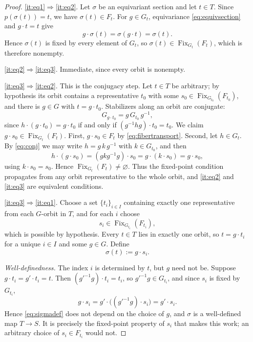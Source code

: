 \documentclass[11pt,reqno]{amsart}
\theoremstyle{plain}
\theoremstyle{definition}
\theoremstyle{remark}
\DeclareMathOperator{\Fix}{Fix}
\begin{document}
\begin{proof}
\ref{it:eq1}$\Rightarrow$\ref{it:eq2}. Let $\sigma$ be an equivariant section and let $t\in T$. Since $p(\sigma(t))=t$, we have $\sigma(t)\in F_{t}$. For $g\in G_{t}$, equivariance \eqref{eq:equivsection} and $g\cdot t=t$ give
\[
g\cdot\sigma(t)=\sigma(g\cdot t)=\sigma(t).
\]
Hence $\sigma(t)$ is fixed by every element of $G_{t}$, so $\sigma(t)\in\Fix_{G_{t}}(F_{t})$, which is therefore nonempty.

\ref{it:eq2}$\Rightarrow$\ref{it:eq3}. Immediate, since every orbit is nonempty.

\ref{it:eq3}$\Rightarrow$\ref{it:eq2}. This is the conjugacy step. Let $t\in T$ be arbitrary; by hypothesis its orbit contains a representative $t_{0}$ with some $s_{0}\in\Fix_{G_{t_{0}}}(F_{t_{0}})$, and there is $g\in G$ with $t=g\cdot t_{0}$. Stabilizers along an orbit are conjugate:
\begin{equation}
\label{eq:conj}
G_{g\cdot t_{0}}=g\,G_{t_{0}}\,g^{-1},
\end{equation}
since $h\cdot(g\cdot t_{0})=g\cdot t_{0}$ if and only if $(g^{-1}hg)\cdot t_{0}=t_{0}$. We claim $g\cdot s_{0}\in\Fix_{G_{t}}(F_{t})$. First, $g\cdot s_{0}\in F_{t}$ by \eqref{eq:fibertransport}. Second, let $h\in G_{t}$. By \eqref{eq:conj} we may write $h=g\,k\,g^{-1}$ with $k\in G_{t_{0}}$, and then
\[
h\cdot(g\cdot s_{0})
=(g k g^{-1} g)\cdot s_{0}
=g\cdot(k\cdot s_{0})
=g\cdot s_{0},
\]
using $k\cdot s_{0}=s_{0}$. Hence $\Fix_{G_{t}}(F_{t})\neq\varnothing$. Thus the fixed-point condition propagates from any orbit representative to the whole orbit, and \ref{it:eq2} and \ref{it:eq3} are equivalent conditions.

\ref{it:eq3}$\Rightarrow$\ref{it:eq1}. Choose a set $\{t_{i}\}_{i\in I}$ containing exactly one representative from each $G$-orbit in $T$, and for each $i$ choose
\[
s_{i}\in\Fix_{G_{t_{i}}}(F_{t_{i}}),
\]
which is possible by hypothesis. Every $t\in T$ lies in exactly one orbit, so $t=g\cdot t_{i}$ for a unique $i\in I$ and some $g\in G$. Define
\begin{equation}
\label{eq:sigmadef}
\sigma(t):=g\cdot s_{i}.
\end{equation}

\emph{Well-definedness.} The index $i$ is determined by $t$, but $g$ need not be. Suppose $g\cdot t_{i}=g'\cdot t_{i}=t$. Then $(g'^{-1}g)\cdot t_{i}=t_{i}$, so $g'^{-1}g\in G_{t_{i}}$, and since $s_{i}$ is fixed by $G_{t_{i}}$,
\[
g\cdot s_{i}
=g'\cdot\bigl((g'^{-1}g)\cdot s_{i}\bigr)
=g'\cdot s_{i}.
\]
Hence \eqref{eq:sigmadef} does not depend on the choice of $g$, and $\sigma$ is a well-defined map $T\to S$. It is precisely the fixed-point property of $s_{i}$ that makes this work; an arbitrary choice of $s_{i}\in F_{t_{i}}$ would not.


\end{proof}
\end{document}
